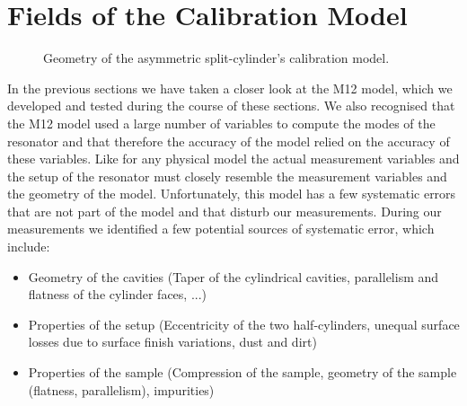 \section{Fields of the Calibration Model}
\begin{figure}
\centering
{}
\caption{Geometry of the asymmetric split-cylinder's calibration model.}\label{fig:cal_model}
\end{figure}
In the previous sections we have taken a closer look at the M12 model, which we developed and tested during the course of these sections. We also recognised that the M12 model used a large number of variables to compute the modes of the resonator and that therefore the accuracy of the model relied on the accuracy of these variables. Like for any physical model the actual measurement variables and the setup of the resonator must closely resemble the measurement variables and the geometry of the model. Unfortunately, this model has a few systematic errors that are not part of the model and that disturb our measurements. During our measurements we identified a few potential sources of systematic error, which include:
\begin{itemize}
\item Geometry of the cavities (Taper of the cylindrical cavities, parallelism and flatness of the cylinder faces, ...)
\item Properties of the setup (Eccentricity of the two half-cylinders, unequal surface losses due to surface finish variations, dust and dirt)
\item Properties of the sample (Compression of the sample, geometry of the sample (flatness, parallelism), impurities)
\end{itemize}
